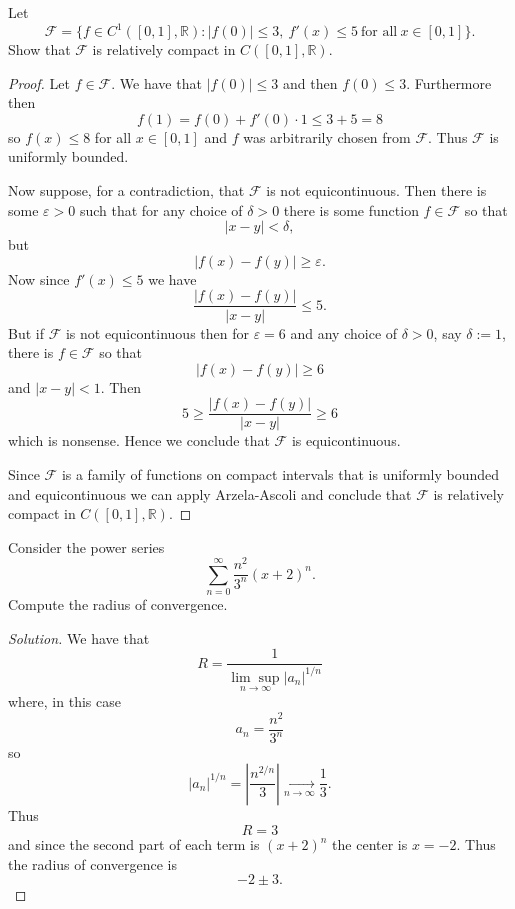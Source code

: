 \begin{prob}
    Let 
    \[
        \mathcal F = 
        \{f \in C^1([0,1], \mathbb R) : 
        |f(0)| \leq 3, \ f'(x)\leq 5 \ \text{for all} \ 
        x \in [0,1]\}.
    \]
    Show that $\mathcal F$ is relatively compact in 
    $C([0,1], \mathbb R)$.
\end{prob}
\begin{proof}
    Let $f \in \mathcal F$. 
    We have that $|f(0)| \leq 3$ and then 
    $f(0) \leq 3$. Furthermore then 
    \[
        f(1) = 
        f(0) + f'(0) \cdot 1 
        \leq 3 + 5 = 8
    \]
    so $f(x) \leq 8$ for all $x \in [0,1]$ and 
    $f$ was arbitrarily chosen from $\mathcal F$. 
    Thus $\mathcal F$ is uniformly bounded. 

    Now suppose, for a contradiction, that $\mathcal F$ is not 
    equicontinuous. Then there is some 
    $\varepsilon > 0$ such that 
    for any choice of $\delta > 0$ there is some function 
    $f \in \mathcal F$ so that 
    \[
        |x-y| < \delta,
    \]
    but 
    \[
        |f(x) - f(y)| \geq \varepsilon.
    \]
    Now since $f'(x) \leq 5$ we have 
    \[
        \frac{|f(x) - f(y)|}{|x-y|} \leq 5. 
    \]
    But if $\mathcal F$ is not equicontinuous then 
    for $\varepsilon = 6$ and any choice of $\delta > 0$, 
    say $\delta := 1$, there 
    is $f \in \mathcal F$ so that 
    \[
        |f(x) - f(y)| \geq 6
    \]
    and $|x-y| < 1$. Then 
    \[
        5 \geq \frac{|f(x) - f(y)|}{|x-y|} \geq 6
    \]
    which is nonsense. 
    Hence we conclude that $\mathcal F$ is equicontinuous.

    Since $\mathcal F$ is a family of functions on compact 
    intervals that is uniformly bounded and equicontinuous 
    we can apply Arzela-Ascoli and conclude that 
    $\mathcal F$ is relatively compact in 
    $C([0,1], \mathbb R)$.
\end{proof}

\begin{prob}
    Consider the power series 
    \[
        \displaystyle\sum_{n=0}^{\infty}\frac{n^2}{3^n}(x+2)^n.
    \]
    Compute the radius of convergence.
\end{prob}
\begin{proof}[Solution]
    We have that 
    \[
        R = \frac{1}{\underset{n\to\infty}{\lim\sup} |a_n|^{1/n}}
    \]
    where, in this case 
    \[
        a_n = \frac{n^2}{3^n}
    \]
    so 
    \[
        |a_n|^{1/n} = \left|\frac{n^{2/n}}{3}\right| 
        \underset{n\to\infty}{\to} \frac{1}{3}. 
    \]
    Thus 
    \[
        R = 3
    \]
    and since the second part of each term is 
    $(x+2)^n$ the center is $x = -2$.
    Thus the radius of convergence is 
    \[
        -2 \pm 3.
    \]
\end{proof}

